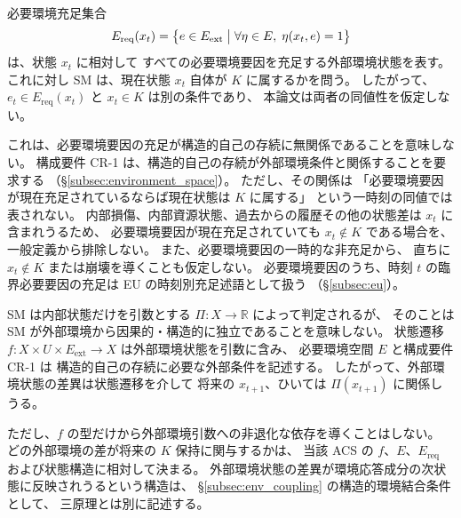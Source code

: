 \begin{remark}[SM と必要環境充足の区別]
\label{rem:sm_vs_Ereq}
必要環境充足集合
\[
  E_{\mathrm{req}}(x_t)
  =
  \bigl\{
    e\in E_{\mathrm{ext}}
    \bigm|
    \forall\eta\in E,\;
    \eta(x_t,e)=1
  \bigr\}
\]
は、状態 $x_t$ に相対して
すべての必要環境要因を充足する外部環境状態を表す。
これに対し SM は、現在状態 $x_t$ 自体が $K$ に属するかを問う。
したがって、$e_t\in E_{\mathrm{req}}(x_t)$ と $x_t\in K$ は別の条件であり、
本論文は両者の同値性を仮定しない。

これは、必要環境要因の充足が構造的自己の存続に無関係であることを意味しない。
構成要件 CR-1 は、構造的自己の存続が外部環境条件と関係することを要求する
（\S\ref{subsec:environment_space}）。
ただし、その関係は
「必要環境要因が現在充足されているならば現在状態は $K$ に属する」
という一時刻の同値では表されない。
内部損傷、内部資源状態、過去からの履歴その他の状態差は $x_t$ に含まれうるため、
必要環境要因が現在充足されていても $x_t\notin K$ である場合を、
一般定義から排除しない。
また、必要環境要因の一時的な非充足から、
直ちに $x_t\notin K$ または崩壊を導くことも仮定しない。
必要環境要因のうち、時刻 $t$ の臨界必要要因の充足は EU の時刻別充足述語として扱う
（\S\ref{subsec:eu}）。
\end{remark}

\begin{remark}
\label{rem:sm_environment_dependency}
SM は内部状態だけを引数とする $\Pi:X\to\mathbb{R}$ によって判定されるが、
そのことは SM が外部環境から因果的・構造的に独立であることを意味しない。
状態遷移 $f:X\times U\times E_{\mathrm{ext}}\to X$ は外部環境状態を引数に含み、
必要環境空間 $E$ と構成要件 CR-1 は
構造的自己の存続に必要な外部条件を記述する。
したがって、外部環境状態の差異は状態遷移を介して
将来の $x_{t+1}$、ひいては $\Pi(x_{t+1})$ に関係しうる。

ただし、$f$ の型だけから外部環境引数への非退化な依存を導くことはしない。
どの外部環境の差が将来の $K$ 保持に関与するかは、
当該 ACS の $f$、$E$、$E_{\mathrm{req}}$ および状態構造に相対して決まる。
外部環境状態の差異が環境応答成分の次状態に反映されうるという構造は、
\S\ref{subsec:env_coupling} の構造的環境結合条件として、
三原理とは別に記述する。
\end{remark}

